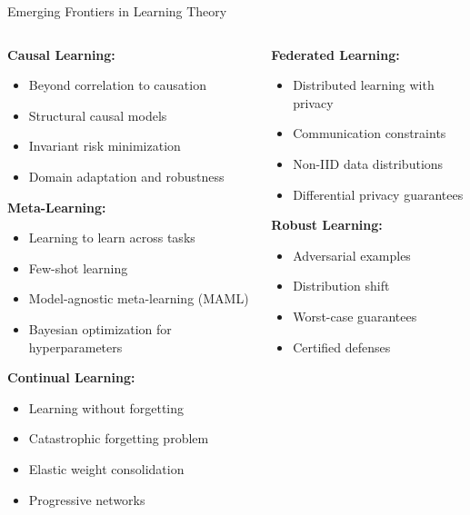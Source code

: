 \documentclass[aspectratio=169,11pt]{beamer}
\begin{document}
\begin{frame}{Emerging Frontiers in Learning Theory}
\begin{columns}
\begin{column}{0.5\textwidth}
\textbf{Causal Learning:}
\begin{itemize}
\item Beyond correlation to causation
\item Structural causal models
\item Invariant risk minimization
\item Domain adaptation and robustness
\end{itemize}

\vspace{0.3cm}
\textbf{Meta-Learning:}
\begin{itemize}
\item Learning to learn across tasks
\item Few-shot learning
\item Model-agnostic meta-learning (MAML)
\item Bayesian optimization for hyperparameters
\end{itemize}

\vspace{0.3cm}
\textbf{Continual Learning:}
\begin{itemize}
\item Learning without forgetting
\item Catastrophic forgetting problem
\item Elastic weight consolidation
\item Progressive networks
\end{itemize}
\end{column}
\begin{column}{0.5\textwidth}
\textbf{Federated Learning:}
\begin{itemize}
\item Distributed learning with privacy
\item Communication constraints
\item Non-IID data distributions
\item Differential privacy guarantees
\end{itemize}

\vspace{0.3cm}
\textbf{Robust Learning:}
\begin{itemize}
\item Adversarial examples
\item Distribution shift
\item Worst-case guarantees
\item Certified defenses
\end{itemize}


\end{column}
\end{columns}
\end{frame}
\end{document}
